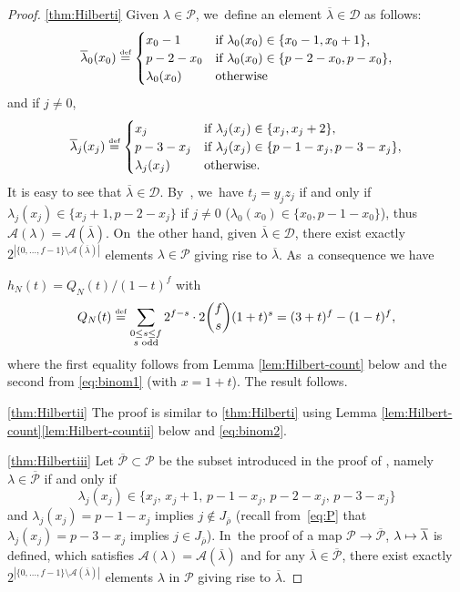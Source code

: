 \documentclass[JEP,XML,SOM,Unicode,NoFloatCountersInSection, NoEqCountersInSection,published]{cedram}
\newcommand\mto{\mathchoice{\longmapsto}{\mapsto}{\mapsto}{\mapsto}}
\let\ovl\overline
\newcommand{\defeq}{\stackrel{\textrm{\tiny{\upshape{def}}}}{=}}
\newcommand{\D}{\mathscr D}
\renewcommand{\P}{\mathscr P}
\newcommand{\brho}{\overline{\rho}}
\theoremstyle{plain}
\theoremstyle{definition}
\begin{document}
\begin{proof}
\eqref{thm:Hilberti} Given $\lambda\in \P$, we~define an element $\overline{\lambda}\in \D$ as follows:\vspace*{-3pt}
\[
\overline{\lambda}_0(x_0)\defeq
\begin{cases}
x_0-1 & \text{if $\lambda_0(x_0)\in\{x_0-1,x_0+1\}$},\\
p-2-x_0 & \text{if $\lambda_0(x_0)\in\{p-2-x_0,p-x_0\}$},\\
\lambda_0(x_0) & \text{otherwise}
\end{cases}
\]
and if $j\neq 0$,\vspace*{-5pt}
\[
\overline{\lambda}_j(x_j)\defeq
\begin{cases}
x_j & \text{if $\lambda_j(x_j)\in\{x_j,x_j+2\}$},\\
p-3-x_j & \text{if $\lambda_j(x_j)\in\{p-1-x_j,p-3-x_j\}$},\\
\lambda_j(x_j) & \text{otherwise}.
\end{cases}
\]
It is easy to see that $\ovl{\lambda}\in \D$. By~\cite[Def.\,3.57]{BHHMS2}, we~have $t_j=y_jz_j$ if and only if $\lambda_j(x_j)\in \{x_j+1,p-2-x_j\}$ if $j\neq 0$ (\resp $\lambda_0(x_0)\in \{x_0,p-1-x_0\}$), thus $\mathcal{A}(\lambda)=\mathcal{A}(\ovl{\lambda})$. On~the other hand, given $\overline{\lambda}\in \D$, there exist exactly $2^{|\{0,\dots,f-1\}\setminus \mathcal{A}(\overline{\lambda})|}$ elements $\lambda\in \P$ giving rise to $\overline{\lambda}$. As~a consequence we have

$h_N(t)=Q_N(t)/(1-t)^f$ with\vspace*{-3pt}
\[
Q_N(t)\defeq \sum_{\substack{0\leq s\leq f\\ s \text{ odd}}} 2^{f-s}\cdot 2\binom{f}{s}(1+t)^s=(3+t)^f-(1-t)^f,
\]
{where the first equality follows from Lemma \ref{lem:Hilbert-count} below and the second from \eqref{eq:binom1} (with $x=1+t$).}
The result follows.

\eqref{thm:Hilbertii} The proof is similar to \eqref{thm:Hilberti} using Lemma \ref{lem:Hilbert-count}\eqref{lem:Hilbert-countii} below and \eqref{eq:binom2}.

\eqref{thm:Hilbertiii}
Let $\overline{\P}\subset \P$ be the subset introduced in the proof of \cite[Prop.\,3.61]{BHHMS2}, namely $\lambda\in\overline{\P}$ if and only if\vspace*{-3pt}
\begin{equation}\label{eq:overline-P}
\lambda_j(x_j)\in\{x_j,\,x_j+1,\,p-1-x_j,\,p-2-x_j,\,p-3-x_j\}
\end{equation}
and $\lambda_j(x_j)=p-1-x_j$ implies $j\notin J_{\brho}$ (recall from~\eqref{eq:P} that $\lambda_j(x_j)=p-3-x_j$ implies $j\in J_{\brho}$). In~the proof of \cite[Prop.\,3.61]{BHHMS2} a map $\P\to\overline{\P}$, $\lambda\mto \overline{\lambda}$ is defined, which satisfies $\mathcal{A}(\lambda)=\mathcal{A}(\overline{\lambda})$ and for any $\ovl\lambda\in\overline{\P}$, there exist exactly $2^{|\{0,\dots,f-1\}\setminus \mathcal{A}(\overline{\lambda})|}$ elements $\lambda$ in $\P$ giving rise to $\overline{\lambda}$.


\end{proof}
\end{document}
